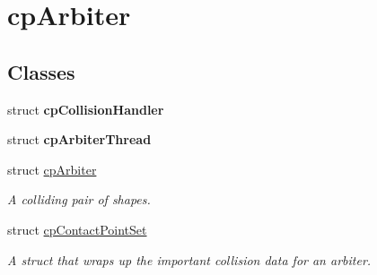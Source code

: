 \hypertarget{group__cp_arbiter}{\section{cp\-Arbiter}
\label{group__cp_arbiter}
}
\subsection*{Classes}
\begin{DoxyCompactItemize}
\item 
struct {\bfseries cp\-Collision\-Handler}
\item 
struct {\bfseries cp\-Arbiter\-Thread}
\item 
struct \hyperlink{structcp_arbiter}{cp\-Arbiter}
\begin{DoxyCompactList}\small\item\em A colliding pair of shapes. \end{DoxyCompactList}\item 
struct \hyperlink{structcp_contact_point_set}{cp\-Contact\-Point\-Set}
\begin{DoxyCompactList}\small\item\em A struct that wraps up the important collision data for an arbiter. \end{DoxyCompactList}\end{DoxyCompactItemize}

